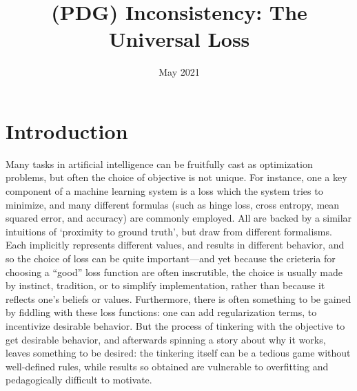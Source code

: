 \documentclass{article}
\title{(PDG) Inconsistency: The Universal Loss}
\author{}
\date{May 2021}
\theoremstyle{plain}
\theoremstyle{definition}
\begin{document}
\maketitle


\begin{abstract}
\end{abstract}

\section{Introduction}
Many tasks in artificial intelligence can be fruitfully cast as optimization problems, but often the choice of objective is not unique.
%
For instance, one a key component of a machine learning system is a loss which the system tries to minimize, and many different formulas (such as hinge loss, cross entropy, mean squared error, and accuracy) are commonly employed.
All are backed by a similar intuitions of `proximity to ground truth', but draw from different formalisms.
Each implicitly represents different values, and results in different behavior, and so the choice of loss can be quite important---and yet because the crieteria for choosing a ``good'' loss function are often inscrutible, the choice is usually made by instinct, tradition, or to simplify implementation, rather than because it reflects one's beliefs or values.
Furthermore, there is often something to be gained by fiddling with these loss functions: one can add regularization terms, to incentivize desirable behavior.
But the process of tinkering with the objective to get desirable behavior, and afterwards spinning a story about why it works, leaves something to be desired:
the tinkering itself can be a tedious game without well-defined rules, while results so obtained are vulnerable to overfitting and pedagogically difficult to motivate.
%
\end{document}
